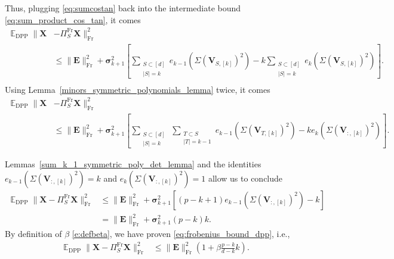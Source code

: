 \documentclass[twoside,11pt]{book}
\numberwithin{theorem}{chapter}
\numberwithin{definition}{chapter}
\numberwithin{proposition}{chapter}
\numberwithin{corollary}{chapter}
\numberwithin{example}{chapter}
\numberwithin{lemma}{chapter}
\numberwithin{assumption}{chapter}
\numberwithin{equation}{chapter}
\numberwithin{figure}{chapter}
\DeclareMathOperator{\Fr}{\mathrm{Fr}}
\DeclareMathOperator{\DPP}{\mathrm{DPP}}
\DeclareMathOperator{\EX}{\mathbb{E}}
\begin{document}
Thus, plugging \eqref{eq:sumcostan} back into the intermediate bound \eqref{eq:sum_product_cos_tan}, it comes
\begin{align}\label{eq:bound_tan_in_expectation_under_sparsity}
    \EX_{\DPP} \| \bm{X} &- \Pi_{S}^{\Fr}\bm{X} \|_{\Fr}^{2}\nonumber\\
      &\leq \| \bm{E}\|_{\Fr}^{2} + \bm{\sigma}_{k+1}^{2} \left[\sum\limits_{\substack{S \subset [d]\\ |S| = k}} e_{k-1}(\Sigma(\bm{V}_{S,[k]})^{2}) -  k \sum_{\substack{S \subset [d]\\ |S| = k}}e_{k}(\Sigma(\bm{V}_{S,[k]})^{2})\right]\nonumber.\\
\end{align}
Using Lemma~\ref{minors_symmetric_polynomials_lemma} twice, it comes
\begin{align}
  \EX_{\DPP} \| \bm{X} &- \Pi_{S}^{\Fr}\bm{X} \|_{\Fr}^{2} \nonumber\\
  &\leq \| \bm{E}\|_{\Fr}^{2} + \bm{\sigma}_{k+1}^{2} \left[\sum_{\substack{S \subset [d]\\ |S| = k}} \,\sum_{\substack{T \subset S\\ |T| = k-1}} e_{k-1}(\Sigma(\bm{V}_{T,[k]})^{2}) -  ke_{k}(\Sigma(\bm{V}_{:,[k]})^{2})\right]
  \label{e:doubleSumTrick}.
\end{align}

Lemmas~\ref{sum_k_1_symmetric_poly_det_lemma} and the identities $e_{k-1}(\Sigma(\bm{V}_{:,[k]})^{2}) = k$ and $e_{k}(\Sigma(\bm{V}_{:,[k]})^{2}) = 1$ allow us to conclude
\begin{align}
  \EX_{\DPP} \| \bm{X} - \Pi_{S}^{\Fr}\bm{X} \|_{\Fr}^{2} &\leq \| \bm{E}\|_{\Fr}^{2} + \bm{\sigma}_{k+1}^{2} \left[ (p-k+1)e_{k-1}(\Sigma(\bm{V}_{:,[k]})^{2}) -  k \right]\\
  &=\| \bm{E}\|_{\Fr}^{2} + \bm{\sigma}_{k+1}^{2} (p-k)k.
\end{align}
By definition of $\beta$ \eqref{e:defbeta}, we have proven \eqref{eq:frobenius_bound_dpp}, i.e.,
\begin{align*}
    \EX_{\DPP} \| \bm{X} - \Pi_{S}^{\Fr}\bm{X} \|_{\Fr}^{2}
  & \leq \| \bm{E}\|_{\Fr}^{2} \left(1 + \beta \frac{p-k}{d-k}k \right).
\end{align*}
\end{document}
